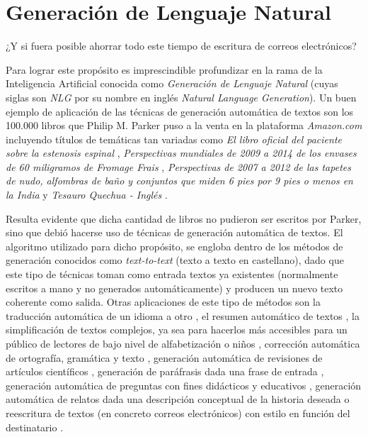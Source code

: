 \section{Generación de Lenguaje Natural}
¿Y si fuera posible ahorrar todo este tiempo de escritura de correos electrónicos?

Para lograr este propósito es imprescindible profundizar en la rama de la Inteligencia Artificial conocida como \textit{Generación de Lenguaje Natural} (cuyas siglas son \textit{NLG} por su nombre en inglés \textit{Natural Language Generation}). Un buen ejemplo de aplicación de las técnicas de generación automática de textos son los 100.000 libros que Philip M. Parker puso a la venta en la plataforma \textit{Amazon.com} incluyendo títulos de temáticas tan variadas como \textit{El libro oficial del paciente sobre la estenosis espinal} \citep{parker2002official}, \textit{Perspectivas mundiales de 2009 a 2014 de los envases de 60 miligramos de Fromage Frais} \citep{parkerfromage},  \textit{Perspectivas de 2007 a 2012 de las tapetes de nudo, alfombras de baño y conjuntos que miden 6 pies por 9 pies o menos en la India} \citep{parkerrugs} y \textit{Tesauro Quechua - Inglés} \citep{parkerquechua}.

Resulta evidente que dicha cantidad de libros no pudieron ser escritos por Parker, sino que debió hacerse uso de técnicas de generación automática de textos. El algoritmo utilizado para dicho propósito, se engloba dentro de los métodos de generación conocidos como \textit{text-to-text} (texto a texto en castellano), dado que este tipo de técnicas toman como entrada textos ya existentes (normalmente escritos a mano y no generados automáticamente) y producen un nuevo texto coherente como salida. Otras aplicaciones de este tipo de métodos son la traducción automática de un idioma a otro \citep{hutchins2009introduction, oettinger2013automatic}, el resumen automático de textos \citep{mani2001automatic, nenkova2011automatic}, la simplificación de textos complejos, ya sea para hacerlos más accesibles para un público de lectores de bajo nivel de alfabetización \citep{siddharthan2014survey, bautista2011empirical} o niños \citep{macdonald2016summarising}, corrección automática de ortografía, gramática y texto \citep{kukich1992techniques, ng2014conll}, generación automática de revisiones de artículos científicos \citep{bartoli2016your}, generación de paráfrasis dada una frase de entrada \citep{bannard2005paraphrasing}, generación automática de preguntas con fines didácticos y educativos \citep{brown2005automatic}, generación automática de relatos dada una descripción conceptual de la historia deseada \citep{gervas2004story} o reescritura de textos (en concreto correos electrónicos) con estilo en función del destinatario \citep{mitfg}.


